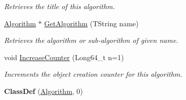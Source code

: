 \begin{DoxyCompactItemize}
\begin{DoxyCompactList}\small\item\em Retrieves the title of this algorithm. \end{DoxyCompactList}\item 
\hyperlink{class_h_a_l_1_1_algorithm}{Algorithm} $\ast$ \hyperlink{class_h_a_l_1_1_algorithm_aa7412319fa47fedf880a7d276484d5b3}{Get\+Algorithm} (T\+String name)
\begin{DoxyCompactList}\small\item\em Retrieves the algorithm or sub-\/algorithm of given name. \end{DoxyCompactList}\item 
void \hyperlink{class_h_a_l_1_1_algorithm_ac5cb321a9513f6a58312747eb74cf0cb}{Increase\+Counter} (Long64\+\_\+t n=1)
\begin{DoxyCompactList}\small\item\em Increments the object creation counter for this algorithm. \end{DoxyCompactList}\item 
\hypertarget{class_h_a_l_1_1_algorithm_a09511e688e6b469d6ab2757728e35960}{{\bfseries Class\+Def} (\hyperlink{class_h_a_l_1_1_algorithm}{Algorithm}, 0)}\label{class_h_a_l_1_1_algorithm_a09511e688e6b469d6ab2757728e35960}

\end{DoxyCompactItemize}

